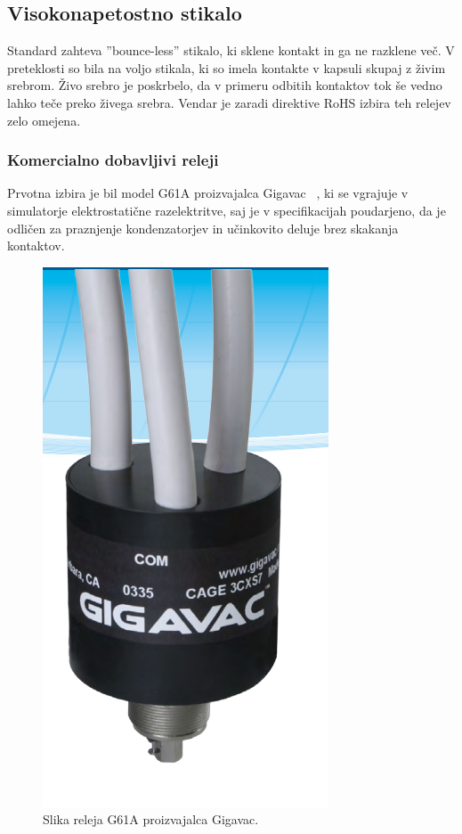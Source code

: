 \documentclass[a4paper,twoside,openright,12pt,Slovene]{book}
\begin{document}
	\subsection{Visokonapetostno stikalo} \label{Visokonapetostno stikalo}
	Standard zahteva ''bounce-less'' stikalo, ki sklene kontakt in ga ne razklene več. V preteklosti so bila na voljo stikala, ki so imela kontakte v kapsuli skupaj z živim srebrom. Živo srebro je poskrbelo, da v primeru odbitih kontaktov tok še vedno lahko teče preko živega srebra. Vendar je zaradi direktive RoHS izbira teh relejev zelo omejena.
	
	\subsubsection{Komercialno dobavljivi releji} \label{Komercialno dobavljivi releji}
     Prvotna izbira je bil model G61A proizvajalca Gigavac ~\cite{Gigavac:G61A}, ki se vgrajuje v simulatorje elektrostatične razelektritve, saj je v specifikacijah poudarjeno, da je odličen za praznjenje kondenzatorjev in učinkovito deluje brez skakanja kontaktov.
    
    \begin{figure}[H]
        \centering
        \includegraphics[width=0.5\columnwidth]{Slike/GigavacG61C.png}
        \caption{\label{GigavacG61C} Slika releja G61A proizvajalca Gigavac.}
    \end{figure}    
    
\end{document}

